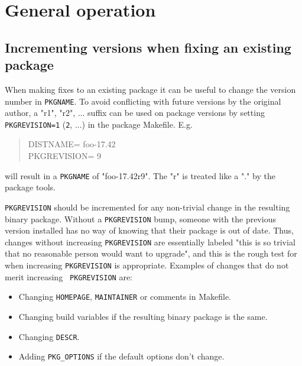 %
%
%
%
%

\section{General operation} %
\label{section:genvars}

\subsection{Incrementing versions when fixing an existing package} %
\label{section:genvars:PKGREVISION}

When making fixes to an existing package it can be useful to change the version
number in {\tt PKGNAME}. To avoid conflicting with future versions by the
original author, a "r1", "r2", ... suffix can be used on package versions by
setting {\tt PKGREVISION=1} ({\tt 2}, ...) in the package Makefile. E.g.
\begin{quote}
   DISTNAME=             foo-17.42\\
   PKGREVISION=          9
\end{quote}
will result in a {\tt PKGNAME} of "foo-17.42r9". The "r" is treated like a "."
by the package tools.

{\tt PKGREVISION} should be incremented for any non-trivial change in the
resulting binary package. Without a {\tt PKGREVISION} bump, someone with the
previous version installed has no way of knowing that their package is out
of date. Thus, changes without increasing {\tt PKGREVISION} are essentially
labeled "this is so trivial that no reasonable person would want to
upgrade", and this is the rough test for when increasing {\tt PKGREVISION}
is appropriate. Examples of changes that do not merit increasing {\tt
PKGREVISION} are:
\begin{itemize}
   \item Changing {\tt HOMEPAGE}, {\tt MAINTAINER} or comments in Makefile.
   \item Changing build variables if the resulting binary package is the same.
   \item Changing {\tt DESCR}.
   \item Adding {\tt PKG\_OPTIONS} if the default options don't change.
\end{itemize}

